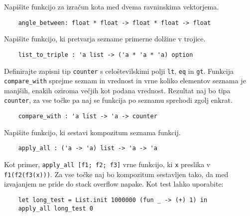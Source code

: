 \documentclass[arhiv]{../izpit}
\begin{document}
	
	

	\naloga 
  
	\podnaloga Napišite funkcijo za izračun kota med dvema ravninskima vektorjema.
  \begin{verbatim}
    angle_between: float * float -> float * float -> float
  \end{verbatim}

  \podnaloga Napišite funkcijo, ki pretvarja sezname primerne dolžine v trojice. 
  \begin{verbatim}
    list_to_triple : 'a list -> ('a * 'a * 'a) option
  \end{verbatim}

  \podnaloga Definirajte zapisni tip \verb|counter| s celoštevilskimi polji \verb|lt|, \verb|eq| in \verb|gt|. Funkcija \verb|compare_with| sprejme seznam in vrednost in vrne koliko elementov seznama je manjših, enakih oziroma večjih kot podana vrednost. Rezultat naj bo tipa \verb|counter|, za vse točke pa naj se funkcija po seznamu sprehodi zgolj enkrat.
  \begin{verbatim}
    compare_with : 'a list -> 'a -> counter
	\end{verbatim}
	
  \podnaloga Napišite funkcijo, ki sestavi kompozitum seznama funkcij. 
  \begin{verbatim}
    apply_all : ('a -> 'a) list -> 'a -> 'a
	\end{verbatim}
  Kot primer, \verb|apply_all [f1; f2; f3]| vrne funkcijo, ki \verb|x| preslika v \verb|f1(f2(f3(x)))|. Za vse točke naj bo kompozitum sestavljen tako, da med izvajanjem ne pride do stack overflow napake. Kot test lahko uporabite:
  \begin{verbatim}
    let long_test = List.init 1000000 (fun _ -> (+) 1) in
    apply_all long_test 0
  \end{verbatim}

  \naloga
  
  
\end{document}
